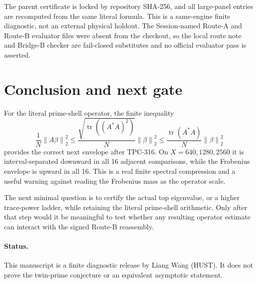 \documentclass[10pt,a4paper]{article}
\newcommand{\norm}[1]{\left\lVert #1\right\rVert}
\newcommand{\tr}{\operatorname{tr}}
\begin{document}
The parent certificate is locked by repository SHA-256, and all large-panel
entries are recomputed from the same literal formula.  This is a same-engine
finite diagnostic, not an external physical holdout.  The Session-named
Route-A and Route-B evaluator files were absent from the checkout, so the
local route note and Bridge-B checker are fail-closed substitutes and no
official evaluator pass is asserted.

\section{Conclusion and next gate}

For the literal prime-shell operator, the finite inequality
\[
 \frac1N\norm{A\beta}_2^2
 \leq \frac{\sqrt{\tr((A^*A)^2)}}{N}\norm{\beta}_2^2
 \leq \frac{\tr(A^*A)}{N}\norm{\beta}_2^2
\]
provides the correct next envelope after TPC-316.  On $X=640,1280,2560$ it
is interval-separated downward in all 16 adjacent comparisons, while the
Frobenius envelope is upward in all 16.  This is a real finite spectral
compression and a useful warning against reading the Frobenius mass as the
operator scale.

The next minimal question is to certify the actual top eigenvalue, or a
higher trace-power ladder, while retaining the literal prime-shell arithmetic.
Only after that step would it be meaningful to test whether any resulting
operator estimate can interact with the signed Route-B reassembly.

\paragraph{Status.}
This manuscript is a finite diagnostic release by Liang Wang (HUST).  It does
not prove the twin-prime conjecture or an equivalent asymptotic statement.


\begingroup\small

\endgroup
\end{document}
